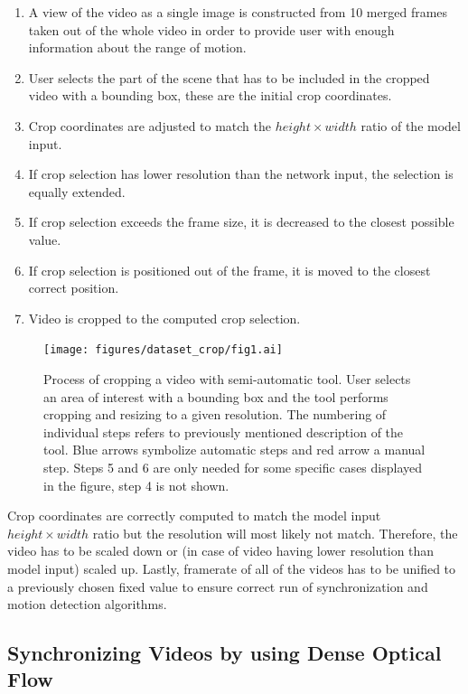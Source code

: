 \begin{enumerate}
    \item A view of the video as a single image is constructed from 10 merged frames taken out of the whole video in order to provide user with enough information about the range of motion.
    \item User selects the part of the scene that has to be included in the cropped video with a bounding box, these are the initial crop coordinates.
    \item Crop coordinates are adjusted to match the $height \times width$ ratio of the model input.
    \item If crop selection has lower resolution than the network input, the selection is equally extended.
    \item If crop selection exceeds the frame size, it is decreased to the closest possible value.
    \item If crop selection is positioned out of the frame, it is moved to the closest correct position.
    \item Video is cropped to the computed crop selection.
\end{enumerate}

\begin{figure}[ht]\centering
    \centering
    \texttt{[image: figures/dataset\_crop/fig1.ai]}
    \caption{Process of cropping a video with semi-automatic tool. User selects an area of interest with a bounding box and the tool performs cropping and resizing to a given resolution. The numbering of individual steps refers to previously mentioned description of the tool. Blue arrows symbolize automatic steps and red arrow a manual step. Steps 5 and 6 are only needed for some specific cases displayed in the figure, step 4 is not shown.}
    \label{fig:dataset-crop-process}
\end{figure}

Crop coordinates are correctly computed to match the model input $height \times width$ ratio but the resolution will most likely not match. Therefore, the video has to be scaled down or (in case of video having lower resolution than model input) scaled up. Lastly, framerate of all of the videos has to be unified to a previously chosen fixed value to ensure correct run of synchronization and motion detection algorithms.

\subsection{\label{sec:dataset-sync}Synchronizing Videos by using Dense Optical Flow}

